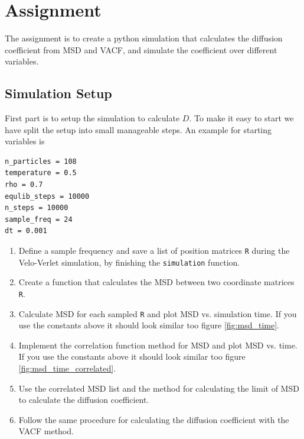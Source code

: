 \documentclass{article}
\newcommand{\code}[1]{\texttt{#1}} %
\begin{document}
\newpage
\section{Assignment}

The assignment is to create a python simulation that calculates 
the diffusion coefficient from MSD and VACF, and simulate
the coefficient over different variables.

\subsection{Simulation Setup}

First part is to setup the simulation to calculate $D$.
To make it easy to start we have split the setup into
small manageable steps. An example for starting variables is

\begin{lstlisting}
n_particles = 108
temperature = 0.5
rho = 0.7
equlib_steps = 10000
n_steps = 10000
sample_freq = 24
dt = 0.001
\end{lstlisting}

\begin{enumerate}

    \item Define a sample frequency and save
    a list of position matrices \code{R} during the
    Velo-Verlet simulation, by finishing the \code{simulation}
    function.

    \item Create a function that calculates the MSD
    between two coordinate matrices \code{R}.

    \item Calculate MSD for each sampled \code{R} and
    plot MSD vs. simulation time.
    If you use the constants above it should look similar
    too figure \ref{fig:msd_time}.

    \item Implement the correlation function method
    for MSD and plot MSD vs. time.
    If you use the constants above it should look similar
    too figure \ref{fig:msd_time_correlated}.

    \item Use the correlated MSD list and
    the method for calculating the limit of MSD
    to calculate the diffusion coefficient.

    \item Follow the same procedure for calculating
    the diffusion coefficient with the VACF method.

\end{enumerate}
\end{document}
